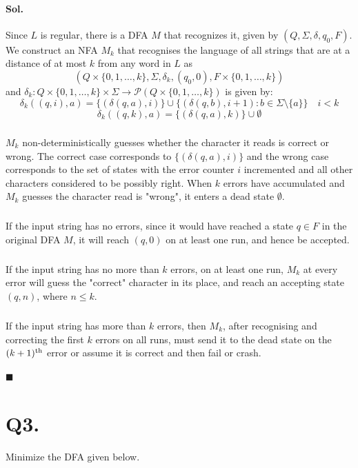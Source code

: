 \documentclass[]{article}
\begin{document}
	\paragraph{Sol.}  Since $L$ is regular, there is a DFA $M$ that recognizes it, given by $(Q, \Sigma, \delta, q_0, F)$. We construct an NFA $M_k$ that recognises the language of all strings that are at a distance of at most $k$ from any word in $L$ as $$(Q \times \{0, 1, \dots, k\}, \Sigma, \delta_k, (q_0, 0), F \times \{0, 1, \dots, k\})$$ and $ \delta_k : Q \times \{0, 1, \dots, k\} \times \Sigma \rightarrow \mathcal{P}(Q \times \{0, 1, \dots, k\})$ is given by:
	$$\delta_k((q, i), a) = \{(\delta(q,a), i)\} \cup \{(\delta(q, b), i+1):b \in \Sigma \setminus \{a\}\} \quad  i < k$$
	$$\delta_k((q, k), a) = \{(\delta(q,a), k)\} \cup \emptyset $$
	\subparagraph{}$M_k$ non-deterministically guesses whether the character it reads is correct or wrong. The correct case corresponds to $\{(\delta(q, a), i)\}$ and the wrong case corresponds to the set of states with the error counter $i$ incremented and all other characters considered to be possibly right. When $k$ errors have accumulated and $M_k$ guesses the character read is "wrong", it enters a dead state $\emptyset$.
	\subparagraph{} If the input string has no errors, since it would have reached a state $q \in F$ in the original DFA $M$, it will reach $(q,0)$ on at least one run, and hence be accepted. \subparagraph{} If the input string has no more than $k$ errors, on at least one run, $M_k$ at every error will guess the "correct" character in its place, and reach an accepting state $(q, n)$, where $n \leq k$. \subparagraph{} If the input string has more than $k$ errors, then $M_k$, after recognising and correcting the first $k$ errors on all runs, must send it to the dead state on the $(k+1)\textsuperscript{th}$ error or assume it is correct and then fail or crash.
	
	$\blacksquare$
	\pagebreak
	\section*{Q3.}
	Minimize the DFA given below.
\end{document}
